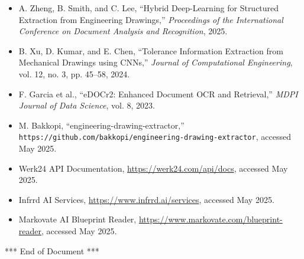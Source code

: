 \documentclass[11pt,a4paper]{article}
\begin{document}
\begin{thebibliography}{9}
\begin{itemize}
  \item A. Zheng, B. Smith, and C. Lee, “Hybrid Deep-Learning for Structured Extraction from Engineering Drawings,” \textit{Proceedings of the International Conference on Document Analysis and Recognition}, 2025.
  \item B. Xu, D. Kumar, and E. Chen, “Tolerance Information Extraction from Mechanical Drawings using CNNs,” \textit{Journal of Computational Engineering}, vol. 12, no. 3, pp. 45–58, 2024.
  \item F. Garcia et al., “eDOCr2: Enhanced Document OCR and Retrieval,” \textit{MDPI Journal of Data Science}, vol. 8, 2023.
  \item M. Bakkopi, “engineering-drawing-extractor,” \texttt{https://github.com/bakkopi/engineering-drawing-extractor}, accessed May 2025.
  \item Werk24 API Documentation, \url{https://werk24.com/api/docs}, accessed May 2025.
  \item Infrrd AI Services, \url{https://www.infrrd.ai/services}, accessed May 2025.
  \item Markovate AI Blueprint Reader, \url{https://www.markovate.com/blueprint-reader}, accessed May 2025.
\end{itemize}
\end{thebibliography}

\vfill
\begin{center}
*** End of Document ***
\end{center}
\end{document}
